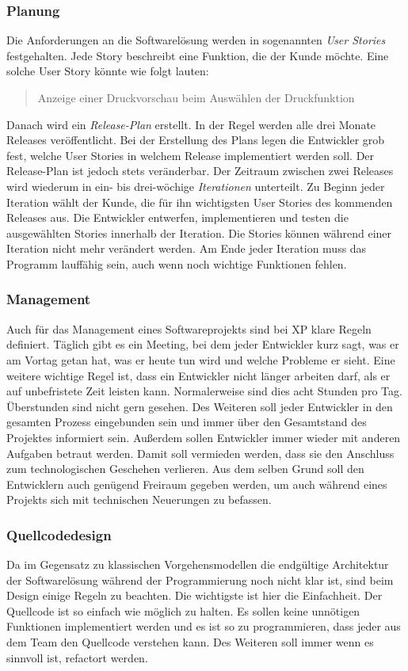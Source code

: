 \subsubsection{Planung}
Die Anforderungen an die Softwarelösung werden in sogenannten \emph{User Stories} festgehalten. Jede Story beschreibt eine Funktion, die der Kunde möchte. Eine solche User Story könnte wie folgt lauten:
\begin{quote}
Anzeige einer Druckvorschau beim Auswählen der Druckfunktion
\end{quote}
Danach wird ein \emph{Release-Plan} erstellt. In der Regel werden alle drei Monate Releases veröffentlicht. Bei der Erstellung des Plans legen die Entwickler grob fest, welche User Stories in welchem Release implementiert werden soll. Der Release-Plan ist jedoch stets veränderbar. Der Zeitraum zwischen zwei Releases wird wiederum in ein- bis drei-wöchige \emph{Iterationen} unterteilt. Zu Beginn jeder Iteration wählt der Kunde, die für ihn wichtigsten User Stories des kommenden Releases aus. Die Entwickler entwerfen, implementieren und testen die ausgewählten Stories innerhalb der Iteration. Die Stories können während einer Iteration nicht mehr verändert werden. Am Ende jeder Iteration muss das Programm lauffähig sein, auch wenn noch wichtige Funktionen fehlen.

\subsubsection{Management}
Auch für das Management eines Softwareprojekts sind bei XP klare Regeln definiert. Täglich gibt es ein Meeting, bei dem jeder Entwickler kurz sagt, was er am Vortag getan hat, was er heute tun wird und welche Probleme er sieht. Eine weitere wichtige Regel ist, dass ein Entwickler nicht länger arbeiten darf, als er auf unbefristete Zeit leisten kann. Normalerweise sind dies acht Stunden pro Tag. Überstunden sind nicht gern gesehen. Des Weiteren soll jeder Entwickler in den gesamten Prozess eingebunden sein und immer über den Gesamtstand des Projektes informiert sein. Außerdem sollen Entwickler immer wieder mit anderen Aufgaben betraut werden. Damit soll vermieden werden, dass sie den Anschluss zum technologischen Geschehen verlieren. Aus dem selben Grund soll den Entwicklern auch genügend Freiraum gegeben werden, um auch während eines Projekts sich mit technischen Neuerungen zu befassen.

\subsubsection{Quellcodedesign}
Da im Gegensatz zu klassischen Vorgehensmodellen die endgültige Architektur der Softwarelösung während der Programmierung noch nicht klar ist, sind beim Design einige Regeln zu beachten. Die wichtigste ist hier die Einfachheit. Der Quellcode ist so einfach wie möglich zu halten. Es sollen keine unnötigen Funktionen implementiert werden und es ist so zu programmieren, dass jeder aus dem Team den Quellcode verstehen kann. Des Weiteren soll immer wenn es sinnvoll ist, refactort werden.

